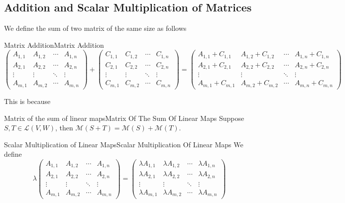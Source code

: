 \documentclass[../main.tex]{subfiles}
\begin{document}
\subsection{Addition and Scalar Multiplication of Matrices}
We define the sum of two matrix of the same size as follows
\begin{definition}{Matrix Addition}{Matrix Addition}
\begin{equation}
\begin{pmatrix}
A_{1,1} & A_{1,2} & \cdots & A_{1,n}\\
A_{2,1} & A_{2,2} & \cdots & A_{2,n}\\
\vdots & \vdots & \ddots & \vdots \\
A_{m,1} & A_{m,2} & \cdots & A_{m,n}
\end{pmatrix}
+
\begin{pmatrix}
C_{1,1} & C_{1,2} & \cdots & C_{1,n}\\
C_{2,1} & C_{2,2} & \cdots & C_{2,n}\\
\vdots & \vdots & \ddots & \vdots \\
C_{m,1} & C_{m,2} & \cdots & C_{m,n}
\end{pmatrix}
=
\begin{pmatrix}
A_{1,1}+C_{1,1} & A_{1,2}+C_{1,2} & \cdots & A_{1,n}+C_{1,n}\\
A_{2,1}+C_{2,1} & A_{2,2}+C_{2,2} & \cdots & A_{2,n}+C_{2,n}\\
\vdots & \vdots & \ddots & \vdots \\
A_{m,1}+C_{m,1} & A_{m,2}+C_{m,2} & \cdots & A_{m,n}+C_{m,n}
\end{pmatrix}
\end{equation}
\end{definition}
This is because
\begin{theorem}{Matrix of the sum of linear maps}{Matrix Of The Sum Of Linear Maps}
Suppose $S,T\in \mathscr{L}(V,W)$, then $\mathscr{M}(S+T)=\mathscr{M}(S)+\mathscr{M}(T)$.
\end{theorem}

\begin{definition}{Scalar Multiplication of Linear Maps}{Scalar Multiplication Of Linear Maps}
We define
\begin{equation}
\lambda 
\begin{pmatrix}
A_{1,1} & A_{1,2} & \cdots & A_{1,n}\\
A_{2,1} & A_{2,2} & \cdots & A_{2,n}\\
\vdots & \vdots & \ddots & \vdots \\
A_{m,1} & A_{m,2} & \cdots & A_{m,n}
\end{pmatrix}
=
\begin{pmatrix}
\lambda A_{1,1} & \lambda A_{1,2} & \cdots & \lambda A_{1,n}\\
\lambda A_{2,1} & \lambda A_{2,2} & \cdots & \lambda A_{2,n}\\
\vdots & \vdots & \ddots & \vdots \\
\lambda A_{m,1} & \lambda A_{m,2} & \cdots & \lambda A_{m,n}
\end{pmatrix}
\end{equation}
\end{definition}
\end{document}
